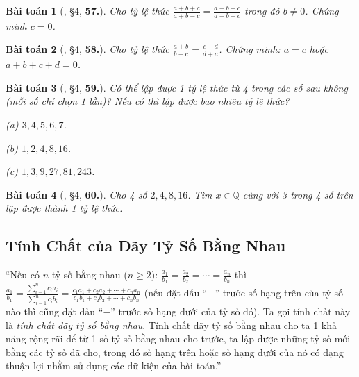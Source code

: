 \documentclass{article}
\numberwithin{equation}{section}
\newtheorem{baitoan}{Bài toán}
\begin{document}
\begin{baitoan}[\cite{Binh_Toan_7_tap_1}, \S4, \textbf{57.}]
	Cho tỷ lệ thức $\frac{a + b + c}{a + b - c} = \frac{a - b + c}{a - b - c}$ trong đó $b\ne 0$. Chứng minh $c = 0$.
\end{baitoan}

\begin{baitoan}[\cite{Binh_Toan_7_tap_1}, \S4, \textbf{58.}]
	Cho tỷ lệ thức $\frac{a + b}{b + c} = \frac{c + d}{d + a}$. Chứng minh: $a = c$ hoặc $a + b + c + d = 0$.
\end{baitoan}

\begin{baitoan}[\cite{Binh_Toan_7_tap_1}, \S4, \textbf{59.}]
	Có thể lập được 1 tỷ lệ thức từ 4 trong các số sau không (mỗi số chỉ chọn 1 lần)? Nếu có thì lập được bao nhiêu tỷ lệ thức?
	\begin{enumerate*}
		\item[(a)] $3,4,5,6,7$.
		\item[(b)] $1,2,4,8,16$.
		\item[(c)] $1,3,9,27,81,243$.
	\end{enumerate*}
\end{baitoan}

\begin{baitoan}[\cite{Binh_Toan_7_tap_1}, \S4, \textbf{60.}]
	Cho 4 số $2,4,8,16$. Tìm $x\in\mathbb{Q}$ cùng với 3 trong 4 số trên lập được thành 1 tỷ lệ thức.
\end{baitoan}


\subsection{Tính Chất của Dãy Tỷ Số Bằng Nhau}
``Nếu có $n$ tỷ số bằng nhau ($n\ge 2$): $\frac{a_1}{b_1} = \frac{a_2}{b_2} = \cdots = \frac{a_n}{b_n}$ thì $\frac{a_1}{b_1} = \frac{\sum_{i=1}^n c_ia_i}{\sum_{i=1}^n c_ib_i} = \frac{c_1a_1 + c_2a_2 + \cdots + c_na_n}{c_1b_1 + c_2b_2 + \cdots + c_nb_n}$ (nếu đặt dấu ``$-$'' trước số hạng trên của tỷ số nào thì cũng đặt dấu ``$-$'' trước số hạng dưới của tỷ số đó). Ta gọi tính chất này là \textit{tính chất dãy tỷ số bằng nhau}. Tính chất dãy tỷ số bằng nhau cho ta 1 khả năng rộng rãi để từ 1 số tỷ số bằng nhau cho trước, ta lập được những tỷ số mới bằng các tỷ số đã cho, trong đó số hạng trên hoặc số hạng dưới của nó có dạng thuận lợi nhằm sử dụng các dữ kiện của bài toán.'' -- \cite[\S5]{Binh_Toan_7_tap_1}
\end{document}
